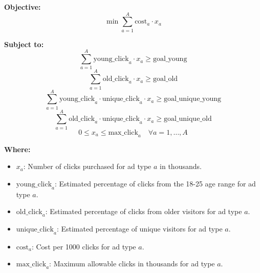 \documentclass{article}
\begin{document}
\textbf{Objective:}
\[
\min \sum_{a=1}^{A} \text{cost}_a \cdot x_a 
\]

\textbf{Subject to:}
\[
\sum_{a=1}^{A} \text{young\_click}_a \cdot x_a \geq \text{goal\_young}
\]
\[
\sum_{a=1}^{A} \text{old\_click}_a \cdot x_a \geq \text{goal\_old}
\]
\[
\sum_{a=1}^{A} \text{young\_click}_a \cdot \text{unique\_click}_a \cdot x_a \geq \text{goal\_unique\_young}
\]
\[
\sum_{a=1}^{A} \text{old\_click}_a \cdot \text{unique\_click}_a \cdot x_a \geq \text{goal\_unique\_old}
\]
\[
0 \leq x_a \leq \text{max\_click}_a \quad \forall a = 1, \ldots, A
\]

\textbf{Where:}
\begin{itemize}
    \item \( x_a \): Number of clicks purchased for ad type \( a \) in thousands.
    \item \(\text{young\_click}_a\): Estimated percentage of clicks from the 18-25 age range for ad type \( a \).
    \item \(\text{old\_click}_a\): Estimated percentage of clicks from older visitors for ad type \( a \).
    \item \(\text{unique\_click}_a\): Estimated percentage of unique visitors for ad type \( a \).
    \item \(\text{cost}_a\): Cost per 1000 clicks for ad type \( a \).
    \item \(\text{max\_click}_a\): Maximum allowable clicks in thousands for ad type \( a \).
\end{itemize}
\end{document}
